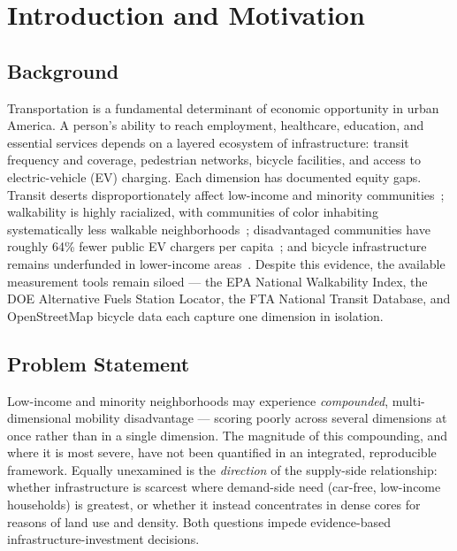 \documentclass[11pt]{article}
\begin{document}
\vspace{6pt}
{\hypersetup{linkcolor=black}
\renewcommand{\contentsname}{\normalsize\bfseries Table of Contents}
\tableofcontents}
\newpage

\section{Introduction and Motivation}

\subsection{Background}
Transportation is a fundamental determinant of economic opportunity in urban
America. A person's ability to reach employment, healthcare, education, and
essential services depends on a layered ecosystem of infrastructure: transit
frequency and coverage, pedestrian networks, bicycle facilities, and access to
electric-vehicle (EV) charging. Each dimension has documented equity gaps.
Transit deserts disproportionately affect low-income and minority
communities~\cite{aman2020,maharjan2024}; walkability is highly racialized, with
communities of color inhabiting systematically less walkable
neighborhoods~\cite{urban2022}; disadvantaged communities have roughly 64\% fewer
public EV chargers per capita~\cite{lou2025}; and bicycle infrastructure remains
underfunded in lower-income areas~\cite{ahmed2024}. Despite this evidence, the
available measurement tools remain siloed --- the EPA National Walkability Index,
the DOE Alternative Fuels Station Locator, the FTA National Transit Database, and
OpenStreetMap bicycle data each capture one dimension in isolation.

\subsection{Problem Statement}
\begin{sloppypar}
Low-income and minority neighborhoods may experience \emph{compounded},
multi-dimensional mobility disadvantage --- scoring poorly across several
dimensions at once rather than in a single dimension. The magnitude of this
compounding, and where it is most severe, have not been quantified in an
integrated, reproducible framework. Equally unexamined is the \emph{direction} of
the supply-side relationship: whether infrastructure is scarcest where
demand-side need (car-free, low-income households) is greatest, or whether it
instead concentrates in dense cores for reasons of land use and density. Both
questions impede evidence-based infrastructure-investment decisions.
\end{sloppypar}
\end{document}

